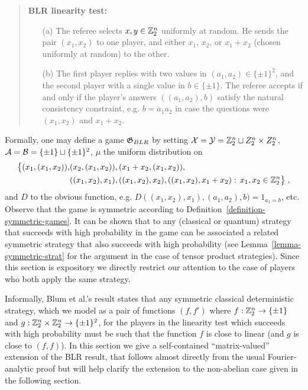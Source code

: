\begin{quote}
\textbf{BLR linearity test:}
\begin{itemize}
\item[(a)] The referee selects $x,y\in\Z_2^n$ uniformly at random. He sends the pair $(x_1,x_2)$ to one player, and either $x_1$, $x_2$, or $x_1+x_2$ (chosen uniformly at random) to the other. 
\item[(b)] The first player replies with two values in $(a_1,a_2)\in \{\pm 1\}^2$, and the second player with a single value in $b\in \{\pm 1\}$. The referee accepts if and only if the player's answers $((a_1,a_2),b)$ satisfy the natural consistency constraint, e.g. $b=a_1a_2$ in case the questions were $(x_1,x_2)$ and $x_1+x_2$. 
\end{itemize}
\end{quote}

Formally, one may define a game $\game_{BLR}$ by setting $\cal{X}=\cal{Y} = \Z_2^n \sqcup Z_2^n \times Z_2^n$, $\cal{A}=\cal{B} = \{\pm 1\}\sqcup \{\pm 1\}^2$, $\mu$ the uniform distribution on 
\begin{align*}
\big\{(x_1,(x_1,x_2)),&(x_2,(x_1,x_2)),(x_1+x_2,(x_1,x_2)),\\
& ((x_1,x_2),x_1),((x_1,x_2),x_2),((x_1,x_2),x_1+x_2):\, x_1,x_2\in\Z_2^n\big\}\;,
\end{align*}
and $D$ to the obvious function, e.g. $D((x_1,x_2),x_1),(a_1,a_2),b)=1_{{a_1=b}}$, etc. Observe that the game is symmetric according to Definition~\ref{definition-symmetric-games}. It can be shown that to any (classical or quantum) strategy that succeeds with high probability in the game can be associated a related symmetric strategy that also succeeds with high probability (see Lemma~\ref{lemma-symmetric-strat} for the argument in the case of tensor product strategies). Since this section is expository we directly restrict our attention to the case of players who both apply the same strategy.

Informally, Blum et al.'s result states that any symmetric classical deterministic strategy, which we model as a pair of functions $(f,f')$ where $f:\Z_2^n \to \{\pm 1\}$ and $g:\Z_2^n\times \Z_2^n \to \{\pm 1\}^2$, for the players in the linearity test which succeeds with high probability must be such that the function $f$ is close to linear (and $g$ is close to $(f,f)$). In this section we give a self-contained ``matrix-valued'' extension of the BLR result, that follows almost directly from the usual Fourier-analytic proof but will  help clarify the extension to the non-abelian case given in the following section. 

